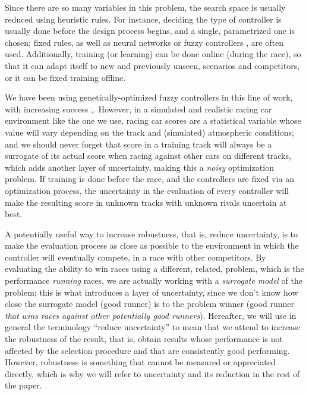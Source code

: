 \documentclass[10pt,journal,compsoc]{IEEEtran}
\begin{document}
Since there are so many variables in this problem, the search space is usually reduced using heuristic rules. For instance, deciding the type of controller is usually done before the design process begins, and a single, parametrized one
is chosen; fixed rules, as well as neural networks \cite{KIM201287} or fuzzy controllers \cite{PerezEvolvingFuzzy09}, are often used. 
Additionally, training (or learning) \cite{Loiacono:2012:LEA:2212908.2212953} can be done online (during the
race), so that it can adapt itself to new and previously unseen,
scenarios and competitors, or it can be fixed training offline. 

We have been using genetically-optimized fuzzy controllers in this line of work, with increasing success \cite{salem_evo17},\cite{salem_evo18}.
However, in a simulated and realistic racing car environment like the one we use, racing car scores are a
    statistical variable whose value will vary depending on the track and
    (simulated) atmospheric conditions; and we should never forget
    that score in a training track will always be a surrogate of its
    actual score when racing against other cars on different tracks,
    which adds another layer of uncertainty, making this a {\em noisy} optimization problem.
If training is done before the
    race, and the controllers are fixed via an optimization process,
    the uncertainty in the evaluation of every controller will make
    the resulting score in unknown tracks with unknown rivals
    uncertain at best.

A potentially useful way to increase robustness, that is, reduce
uncertainty, is to make the evaluation process as close as possible to
the environment in which the controller will eventually compete, in a
race with other competitors. By evaluating the ability to win races
using a different, related, problem, which is the performance {\em
  running} races, we are actually working with a {\em surrogate model}
of the problem; this is what introduces a layer of uncertainty, since
we don't know how close the surrogate model (good runner) is to the
problem winner (good runner {\em that wins races against other
  potentially good runners}).
	Hereafter, we will use in general the
terminology ``reduce uncertainty'' to mean that we attend to increase
the robustness of the result, that is, obtain results whose
performance is not affected by the selection procedure and that are
consistently good performing. However, robustness is something that
cannot be measured or appreciated directly, which is why we will refer
to uncertainty and its reduction in the rest of the paper.
\end{document}
